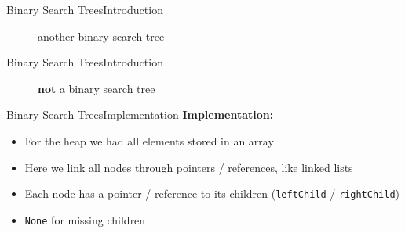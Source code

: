 
\begin{frame}{Binary Search Trees}{Introduction}
  \begin{figure}
    
    \caption{another binary search tree}
    \label{fig:binary_search_trees:binary_tree_example2}
  \end{figure}
\end{frame}


\begin{frame}{Binary Search Trees}{Introduction}
  \begin{figure}
    
    \caption{\textbf{not} a binary search tree}
    \label{fig:binary_search_trees:binary_tree_example3}
  \end{figure}
\end{frame}


\begin{frame}{Binary Search Trees}{Implementation}
  \textbf{Implementation:}
  \begin{itemize}
    \item<2->
      For the heap we had all elements stored in an array
    \item<2->
      Here we link all nodes through pointers / references, like linked lists
    \item<3->
      Each node has a pointer / reference to its children
      (\texttt{\color{Mittel-Blau}leftChild} /
      \texttt{\color{Mittel-Blau}rightChild})
    \item<4->
      \texttt{\color{Mittel-Blau}None} for missing children
  \end{itemize}
  \vspace{-1.0em}
  \begin{figure}
    
    \label{fig:binary_search_trees:binary_tree_impl1}
  \end{figure}
\end{frame}


